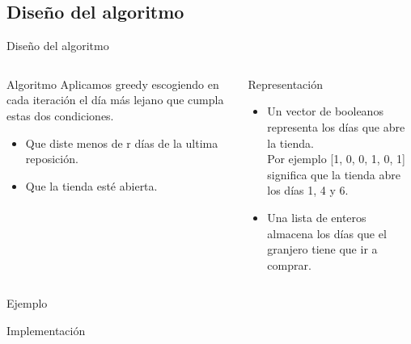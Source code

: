 \subsection{Diseño del algoritmo}
\begin{frame}{Diseño del algoritmo}
\begin{columns}
	\begin{column}{5.5cm}
	\begin{block}{\small Algoritmo}
	{\small Aplicamos greedy escogiendo en cada iteración el día más lejano que cumpla estas dos condiciones.}\\
	\begin{itemize}
	\item {\small Que diste menos de r días de la ultima reposición.}\\
	\item {\small Que la tienda esté abierta.}\\
	\end{itemize}
	\end{block}	
	\end{column}
	
	\begin{column}{5.5cm}
	\begin{block}{\small Representación}
	\begin{itemize}
	\item Un vector de booleanos representa los días que abre la tienda.\\
	Por ejemplo [1, 0, 0, 1, 0, 1] significa que la tienda abre los días 1, 4 y 6.\\
	\item Una lista de enteros almacena los días que el granjero tiene que ir a comprar.
	\end{itemize}
	\end{block}	
	\end{column}	
\end{columns}
\end{frame}

\begin{frame}{Ejemplo}
\begin{center}
\resizebox{3.5in}{!}{}
\end{center}
\end{frame}

\begin{frame}{Implementación}

\end{frame}


